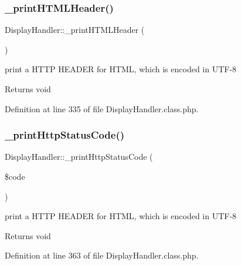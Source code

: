 \hypertarget{classDisplayHandler_abbeb865d70e224403e99570c50d37f1b}{}\label{classDisplayHandler_abbeb865d70e224403e99570c50d37f1b} 
\subsubsection{\texorpdfstring{\+\_\+print\+H\+T\+M\+L\+Header()}{\_printHTMLHeader()}}
{\footnotesize\ttfamily Display\+Handler\+::\+\_\+print\+H\+T\+M\+L\+Header (\begin{DoxyParamCaption}{ }\end{DoxyParamCaption})}

print a H\+T\+TP H\+E\+A\+D\+ER for H\+T\+ML, which is encoded in U\+T\+F-\/8 \begin{DoxyReturn}{Returns}
void 
\end{DoxyReturn}


Definition at line 335 of file Display\+Handler.\+class.\+php.

\hypertarget{classDisplayHandler_a1cdc46d8bb9a6dce319ecdc664c5748c}{}\label{classDisplayHandler_a1cdc46d8bb9a6dce319ecdc664c5748c} 
\subsubsection{\texorpdfstring{\+\_\+print\+Http\+Status\+Code()}{\_printHttpStatusCode()}}
{\footnotesize\ttfamily Display\+Handler\+::\+\_\+print\+Http\+Status\+Code (\begin{DoxyParamCaption}\item[{}]{\$code }\end{DoxyParamCaption})}

print a H\+T\+TP H\+E\+A\+D\+ER for H\+T\+ML, which is encoded in U\+T\+F-\/8 \begin{DoxyReturn}{Returns}
void 
\end{DoxyReturn}


Definition at line 363 of file Display\+Handler.\+class.\+php.

\hypertarget{classDisplayHandler_a62dd794125b2c76780ffdb9615abbb32}{}\label{classDisplayHandler_a62dd794125b2c76780ffdb9615abbb32} 
